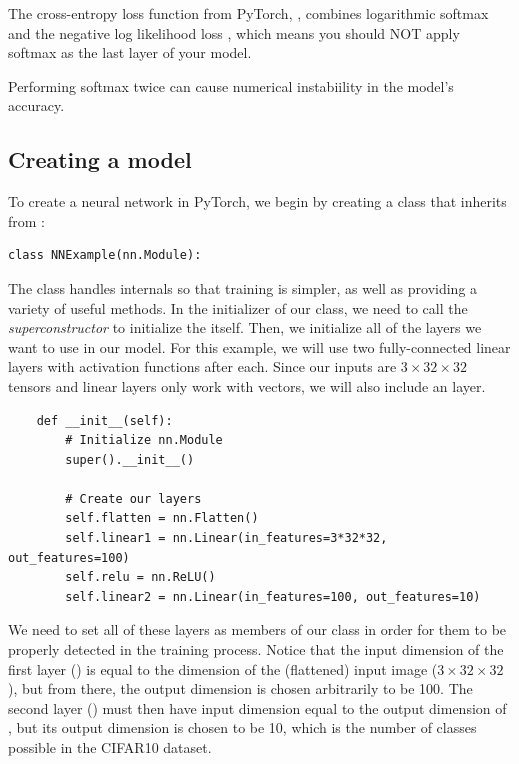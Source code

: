 \begin{warn}
    The cross-entropy loss function from PyTorch, , combines logarithmic softmax  and the negative log likelihood loss ,
    which means you should NOT apply softmax as the last layer of your model.

    Performing softmax twice can cause numerical instabiility in the model's accuracy.
\end{warn}

\subsection*{Creating a model}
To create a neural network in PyTorch, we begin by creating a class that inherits from :
\begin{lstlisting}
class NNExample(nn.Module):
\end{lstlisting}
The class  handles internals so that training is simpler, as well as providing a variety of useful methods.
In the initializer of our class, we need to call the \emph{superconstructor}  to initialize the  itself.
Then, we initialize all of the layers we want to use in our model.
For this example, we will use two fully-connected linear layers with activation functions after each.
Since our inputs are \(3\times32\times32\) tensors and linear layers only work with vectors, we will also include an  layer.
\begin{lstlisting}
    def __init__(self):
        # Initialize nn.Module
        super().__init__()

        # Create our layers
        self.flatten = nn.Flatten()
        self.linear1 = nn.Linear(in_features=3*32*32, out_features=100)
        self.relu = nn.ReLU()
        self.linear2 = nn.Linear(in_features=100, out_features=10)
\end{lstlisting}
We need to set all of these layers as members of our class in order for them to be properly detected in the training process.
Notice that the input dimension of the first layer () is equal to the dimension of the (flattened) input image ($3\times32\times32$), but from there, the output dimension is chosen arbitrarily to be 100.
The second layer () must then have input dimension equal to the output dimension of , but its output dimension is chosen to be 10, which is the number of classes possible in the CIFAR10 dataset.

